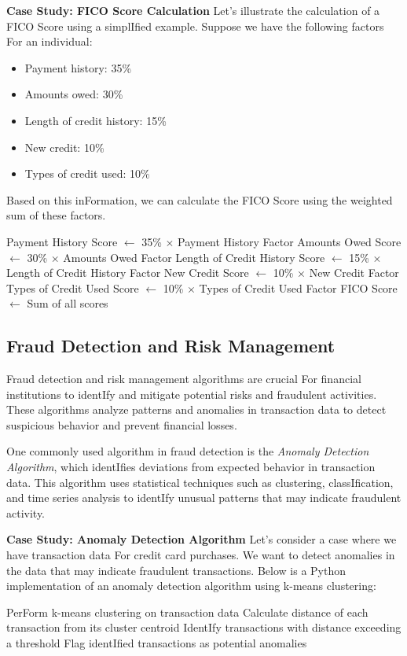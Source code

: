 \documentclass[12pt]{book} %
\begin{document}
\textbf{Case Study: FICO Score Calculation}
Let's illustrate the calculation of a FICO Score using a simplIfied example. Suppose we have the following factors For an individual:
\begin{itemize}
\item Payment history: 35\%
\item Amounts owed: 30\%
\item Length of credit history: 15\%
\item New credit: 10\%
\item Types of credit used: 10\%
\end{itemize}

Based on this inFormation, we can calculate the FICO Score using the weighted sum of these factors.
\FloatBarrier
\begin{algorithm}
\caption{FICO Score Calculation}
\begin{algorithmic}[1]
\State Payment History Score $\gets$ 35\% $\times$ Payment History Factor
\State Amounts Owed Score $\gets$ 30\% $\times$ Amounts Owed Factor
\State Length of Credit History Score $\gets$ 15\% $\times$ Length of Credit History Factor
\State New Credit Score $\gets$ 10\% $\times$ New Credit Factor
\State Types of Credit Used Score $\gets$ 10\% $\times$ Types of Credit Used Factor
\State FICO Score $\gets$ Sum of all scores
\end{algorithmic}
\end{algorithm}
\FloatBarrier

\subsection{Fraud Detection and Risk Management}
Fraud detection and risk management algorithms are crucial For financial institutions to identIfy and mitigate potential risks and fraudulent activities. These algorithms analyze patterns and anomalies in transaction data to detect suspicious behavior and prevent financial losses.

One commonly used algorithm in fraud detection is the \textit{Anomaly Detection Algorithm}, which identIfies deviations from expected behavior in transaction data. This algorithm uses statistical techniques such as clustering, classIfication, and time series analysis to identIfy unusual patterns that may indicate fraudulent activity.

\textbf{Case Study: Anomaly Detection Algorithm}
Let's consider a case where we have transaction data For credit card purchases. We want to detect anomalies in the data that may indicate fraudulent transactions. Below is a Python implementation of an anomaly detection algorithm using k-means clustering:
\FloatBarrier
\begin{algorithm}
\caption{Anomaly Detection Algorithm}
\begin{algorithmic}[1]
\State PerForm k-means clustering on transaction data
\State Calculate distance of each transaction from its cluster centroid
\State IdentIfy transactions with distance exceeding a threshold
\State Flag identIfied transactions as potential anomalies
\end{algorithmic}
\end{algorithm}
\FloatBarrier
\end{document}
